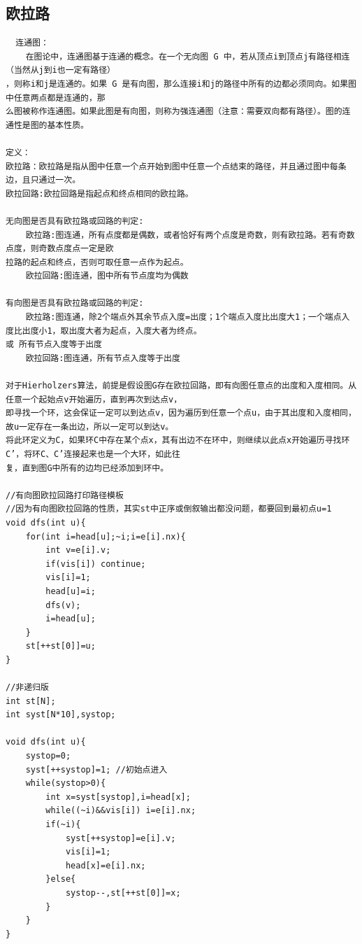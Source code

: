 \documentclass[twoside]{article}
\begin{document}
\subsection{欧拉路}
\begin{lstlisting}
  连通图：
    在图论中，连通图基于连通的概念。在一个无向图 G 中，若从顶点i到顶点j有路径相连（当然从j到i也一定有路径）
，则称i和j是连通的。如果 G 是有向图，那么连接i和j的路径中所有的边都必须同向。如果图中任意两点都是连通的，那
么图被称作连通图。如果此图是有向图，则称为强连通图（注意：需要双向都有路径）。图的连通性是图的基本性质。

定义：
欧拉路：欧拉路是指从图中任意一个点开始到图中任意一个点结束的路径，并且通过图中每条边，且只通过一次。
欧拉回路:欧拉回路是指起点和终点相同的欧拉路。

无向图是否具有欧拉路或回路的判定:
    欧拉路:图连通，所有点度都是偶数，或者恰好有两个点度是奇数，则有欧拉路。若有奇数点度，则奇数点度点一定是欧
拉路的起点和终点，否则可取任意一点作为起点。
    欧拉回路:图连通，图中所有节点度均为偶数

有向图是否具有欧拉路或回路的判定:
    欧拉路:图连通，除2个端点外其余节点入度=出度；1个端点入度比出度大1；一个端点入度比出度小1，取出度大者为起点，入度大者为终点。
或 所有节点入度等于出度
    欧拉回路:图连通，所有节点入度等于出度

对于Hierholzers算法，前提是假设图G存在欧拉回路，即有向图任意点的出度和入度相同。从任意一个起始点v开始遍历，直到再次到达点v，
即寻找一个环，这会保证一定可以到达点v，因为遍历到任意一个点u，由于其出度和入度相同，故u一定存在一条出边，所以一定可以到达v。
将此环定义为C，如果环C中存在某个点x，其有出边不在环中，则继续以此点x开始遍历寻找环C’，将环C、C’连接起来也是一个大环，如此往
复，直到图G中所有的边均已经添加到环中。

//有向图欧拉回路打印路径模板
//因为有向图欧拉回路的性质，其实st中正序或倒叙输出都没问题，都要回到最初点u=1
void dfs(int u){
    for(int i=head[u];~i;i=e[i].nx){
        int v=e[i].v;
        if(vis[i]) continue;
        vis[i]=1;
        head[u]=i;
        dfs(v);
        i=head[u];
    }
    st[++st[0]]=u;
}

//非递归版
int st[N];
int syst[N*10],systop;

void dfs(int u){
    systop=0;
    syst[++systop]=1; //初始点进入
    while(systop>0){
        int x=syst[systop],i=head[x];
        while((~i)&&vis[i]) i=e[i].nx;
        if(~i){
            syst[++systop]=e[i].v;
            vis[i]=1;
            head[x]=e[i].nx;
        }else{
            systop--,st[++st[0]]=x;
        }
    }
}


\end{lstlisting}
\end{document}
